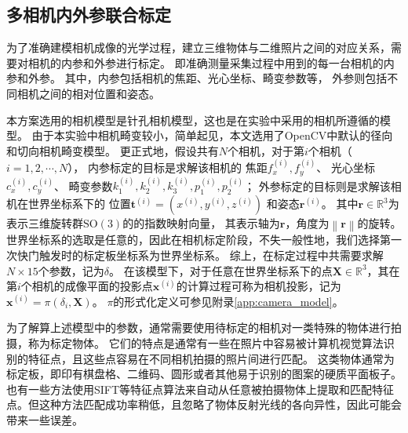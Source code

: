 \subsection{多相机内外参联合标定}
\label{sec:camera_calib}

为了准确建模相机成像的光学过程，建立三维物体与二维照片之间的对应关系，需要对相机的内参和外参进行标定。
即准确测量采集过程中用到的每一台相机的内参和外参。
其中，内参包括相机的焦距、光心坐标、畸变参数等，
外参则包括不同相机之间的相对位置和姿态。

本方案选用的相机模型是针孔相机模型，这也是在实验中采用的相机所遵循的模型。
由于本实验中相机畸变较小，简单起见，本文选用了OpenCV中默认的径向和切向相机畸变模型\citep{opencv_cam}。
更正式地，假设共有$N$个相机，对于第$i$个相机（$i=1,2,\cdots,N$），
内参标定的目标是求解该相机的
焦距$f_x^{(i)},f_y^{(i)}$、
光心坐标$c_x^{(i)},c_y^{(i)}$、
畸变参数$k_1^{(i)},k_2^{(i)},k_3^{(i)},p_1^{(i)},p_2^{(i)}$；
外参标定的目标则是求解该相机在世界坐标系下的
位置$\mathbf{t}^{(i)}=\left(x^{(i)},y^{(i)},z^{(i)}\right)$
和姿态$\mathbf{r}^{(i)}$。
其中$\mathbf{r}\in \mathbb{R}^3$为表示三维旋转群$\mathrm{SO(3)}$的的指数映射向量，
其表示轴为$\mathbf{r}$，角度为$\left\| \mathbf{r}\right\|$的旋转。
世界坐标系的选取是任意的，因此在相机标定阶段，不失一般性地，我们选择第一次快门触发时的标定板坐标系为世界坐标系。
\def\camparam{\delta}
综上，在标定过程中共需要求解$N\times 15$个参数，记为$\camparam$。
在该模型下，对于任意在世界坐标系下的点$\mathbf{X}\in \mathbb{R}^3$，其在第$i$个相机的成像平面的投影点$\mathbf{x}^{(i)}$的计算过程可称为相机投影，记为$\mathbf{x}^{(i)}=\pi(\camparam_i, \mathbf{X})$。
$\pi$的形式化定义可参见附录\ref{app:camera_model}。

为了解算上述模型中的参数，通常需要使用待标定的相机对一类特殊的物体进行拍摄，称为标定物体。
它们的特点是通常有一些在照片中容易被计算机视觉算法识别的特征点，且这些点容易在不同相机拍摄的照片间进行匹配。
这类物体通常为标定板，即印有棋盘格、二维码、圆形或者其他易于识别的图案的硬质平面板子。
也有一些方法\cite{colmap}使用SIFT等特征点算法来自动从任意被拍摄物体上提取和匹配特征点。但这种方法匹配成功率稍低，且忽略了物体反射光线的各向异性，因此可能会带来一些误差。

